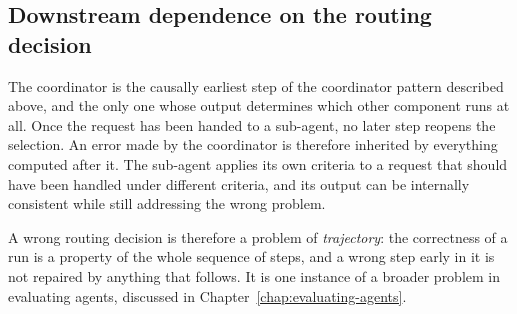 \subsection{Downstream dependence on the routing decision}
\label{subsec:downstream-dependence}

The coordinator is the causally earliest step of the coordinator pattern described above, and the only one whose output determines which other component runs at all. Once the request has been handed to a sub-agent, no later step reopens the selection. An error made by the coordinator is therefore inherited by everything computed after it. The sub-agent applies its own criteria to a request that should have been handled under different criteria, and its output can be internally consistent while still addressing the wrong problem.

A wrong routing decision is therefore a problem of \emph{trajectory}: the correctness of a run is a property of the whole sequence of steps, and a wrong step early in it is not repaired by anything that follows. It is one instance of a broader problem in evaluating agents, discussed in Chapter~\ref{chap:evaluating-agents}.
